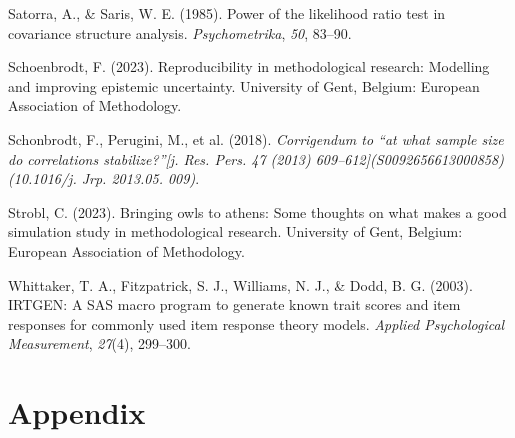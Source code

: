 \documentclass[
  letterpaper,
  DIV=11,
  numbers=noendperiod]{scrartcl}
\newlength{\cslhangindent}
\newenvironment{CSLReferences}[2] %
 {\begin{list}{}{%
  \setlength{\itemindent}{0pt}
  \setlength{\leftmargin}{0pt}
  \setlength{\parsep}{0pt}
  \ifodd #1
   \setlength{\leftmargin}{\cslhangindent}
   \setlength{\itemindent}{-1\cslhangindent}
  \fi
  \setlength{\itemsep}{#2\baselineskip}}}
 {\end{list}}
\begin{document}
\begin{CSLReferences}{1}{0}
Satorra, A., \& Saris, W. E. (1985). Power of the likelihood ratio test
in covariance structure analysis. \emph{Psychometrika}, \emph{50},
83--90.

Schoenbrodt, F. (2023). Reproducibility in methodological research:
Modelling and improving epistemic uncertainty. University of Gent,
Belgium: European Association of Methodology.

Schonbrodt, F., Perugini, M., et al. (2018). \emph{Corrigendum to {``at
what sample size do correlations stabilize?''}{[}j. Res. Pers. 47 (2013)
609--612{]}(S0092656613000858)(10.1016/j. Jrp. 2013.05. 009)}.

Strobl, C. (2023). Bringing owls to athens: Some thoughts on what makes
a good simulation study in methodological research. University of Gent,
Belgium: European Association of Methodology.

Whittaker, T. A., Fitzpatrick, S. J., Williams, N. J., \& Dodd, B. G.
(2003). IRTGEN: A SAS macro program to generate known trait scores and
item responses for commonly used item response theory models.
\emph{Applied Psychological Measurement}, \emph{27}(4), 299--300.

\end{CSLReferences}

\section*{Appendix}\label{appendix}
\end{document}
